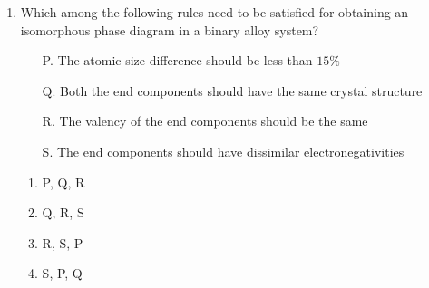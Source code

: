 \documentclass[journal,12pt,onecolumn]{IEEEtran}
\theoremstyle{remark}
\begin{document}
\begin{enumerate}
\begin{multicols}{2}
        \end{multicols}
        \begin{multicols}{2}
            \begin{enumerate}
                \item[]\columnbreak
                \item[5.]  High performance skate boards
            \end{enumerate}

        \end{multicols}

        \hfill{}
        \begin{enumerate}
        \end{enumerate}

    \item Which among the following rules need to be satisfied for obtaining an isomorphous phase diagram
        in a binary alloy system? 
        \begin{enumerate}
            \item[P.] The atomic size difference should be less than $15\%$ 
            \item[Q.] Both the end components should have the same crystal structure
            \item[R.] The valency of the end components should be the same
            \item[S.] The end components should have dissimilar electronegativities
        \end{enumerate}
        \hfill{}
        \begin{multicols}{4}
            \begin{enumerate}
                \item  P, Q, R \columnbreak
                \item  Q, R, S \columnbreak
                \item  R, S, P  \columnbreak
                \item  S, P, Q
            \end{enumerate}
        \end{multicols}



\end{enumerate}
\end{document}
